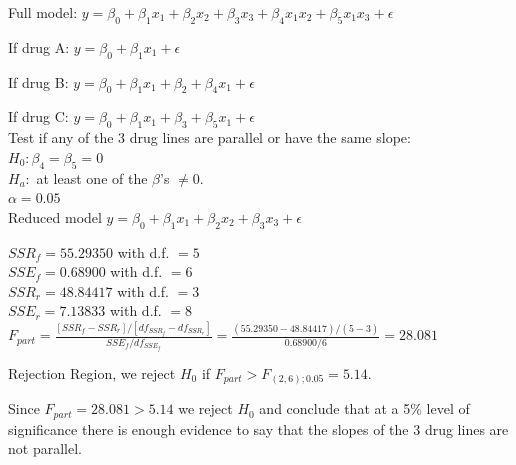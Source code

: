 \documentclass{article}
\begin{document}
\begin{enumerate}[1.]
Full model: $y = \beta_0 + \beta_1x_1 + \beta_2x_2 + \beta_3x_3 + \beta_4x_1x_2 + \beta_5x_1x_3 + \epsilon$

If drug A: $y = \beta_0 + \beta_1x_1 + \epsilon$

If drug B: $y = \beta_0 + \beta_1x_1 + \beta_2 + \beta_4x_1 + \epsilon$

If drug C: $y = \beta_0 + \beta_1x_1 + \beta_3 + \beta_5x_1 + \epsilon$ \\

Test if any of the 3 drug lines are parallel or have the same slope: \\
$H_0: \beta_4 = \beta_5 = 0$ \\
$H_a:$ at least one of the $\beta$'s $\neq 0$. \\
$\alpha = 0.05$ \\

Reduced model $y = \beta_0 + \beta_1x_1 + \beta_2x_2 + \beta_3x_3 + \epsilon$

$SSR_f = 55.29350$ with d.f. $= 5$ \\
$SSE_f = 0.68900$ with d.f. $=6$ \\
$SSR_r = 48.84417$ with d.f. $= 3$ \\
$SSE_r = 7.13833$ with d.f. $= 8$ \\

$F_{part} = \frac{ [SSR_f - SSR_r] / [df_{SSR_f} - df_{SSR_r} ] }{ SSE_f / df_{SSE_f} } = \frac{ (55.29350 - 48.84417)/(5 - 3) }{ 0.68900 / 6} = 28.081$

Rejection Region, we reject $H_0$ if $F_{part} > F_{(2,6); 0.05} = 5.14$.

Since $F_{part} = 28.081 > 5.14$ we reject $H_0$ and conclude that at a 5\% level of significance there is enough evidence to  say that the slopes of the 3 drug lines are not parallel.

\end{enumerate}
\end{document}
